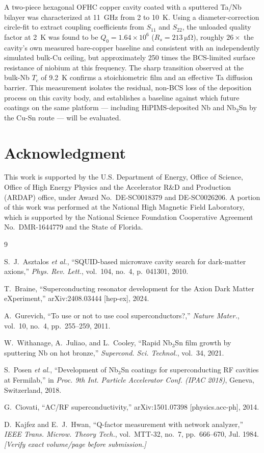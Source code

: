 \documentclass[10pt,journal]{IEEEtran}
\begin{document}
A two-piece hexagonal OFHC copper cavity coated with a sputtered Ta/Nb bilayer was characterized at \SI{11}{\giga\hertz} from 2 to \SI{10}{\kelvin}. Using a diameter-correction circle-fit to extract coupling coefficients from $S_{11}$ and $S_{22}$, the unloaded quality factor at \SI{2}{\kelvin} was found to be $Q_0=1.64\times10^{6}$ ($R_s=\SI{213}{\micro\ohm}$), roughly $26\times$ the cavity's own measured bare-copper baseline and consistent with an independently simulated bulk-Cu ceiling, but approximately 250 times the BCS-limited surface resistance of niobium at this frequency. The sharp transition observed at the bulk-Nb $T_c$ of \SI{9.2}{\kelvin} confirms a stoichiometric film and an effective Ta diffusion barrier. This measurement isolates the residual, non-BCS loss of the deposition process on this cavity body, and establishes a baseline against which future coatings on the same platform --- including HiPIMS-deposited Nb and Nb$_3$Sn by the Cu-Sn route --- will be evaluated.

\section*{Acknowledgment}
This work is supported by the U.S. Department of Energy, Office of Science, Office of High Energy Physics and the Accelerator R\&D and Production (ARDAP) office, under Award No.\ DE-SC0018379 and DE-SC0026206. A portion of this work was performed at the National High Magnetic Field Laboratory, which is supported by the National Science Foundation Cooperative Agreement No.\ DMR-1644779 and the State of Florida.

\begin{thebibliography}{9}

S.~J.~Asztalos \emph{et al.}, ``SQUID-based microwave cavity search for dark-matter axions,'' \emph{Phys. Rev. Lett.}, vol.~104, no.~4, p.~041301, 2010.

T.~Braine, ``Superconducting resonator development for the Axion Dark Matter eXperiment,'' arXiv:2408.03444 [hep-ex], 2024.

A.~Gurevich, ``To use or not to use cool superconductors?,'' \emph{Nature Mater.}, vol.~10, no.~4, pp.~255--259, 2011.

W.~Withanage, A.~Juliao, and L.~Cooley, ``Rapid Nb$_3$Sn film growth by sputtering Nb on hot bronze,'' \emph{Supercond. Sci. Technol.}, vol.~34, 2021.

S.~Posen \emph{et al.}, ``Development of Nb$_3$Sn coatings for superconducting RF cavities at Fermilab,'' in \emph{Proc. 9th Int. Particle Accelerator Conf. (IPAC 2018)}, Geneva, Switzerland, 2018.

G.~Ciovati, ``AC/RF superconductivity,'' arXiv:1501.07398 [physics.acc-ph], 2014.

D.~Kajfez and E.~J.~Hwan, ``Q-factor measurement with network analyzer,'' \emph{IEEE Trans. Microw. Theory Tech.}, vol.~MTT-32, no.~7, pp.~666--670, Jul. 1984. \emph{[Verify exact volume/page before submission.]}

\end{thebibliography}
\end{document}

